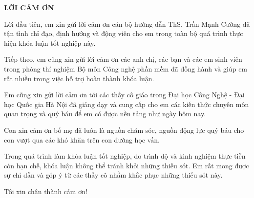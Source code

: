 \begin{center}
\textbf{\large{LỜI CẢM ƠN}	}
\end{center}
Lời đầu tiên, em xin gửi lời cảm ơn cán bộ hướng dẫn ThS. Trần Mạnh Cường đã tận tình chỉ đạo, định hướng và động viên cho em trong toàn bộ quá trình thực hiện khóa luận tốt nghiệp này.

Tiếp theo, em cũng xin gửi lời cảm ơn các anh chị, các bạn và các em sinh viên trong phòng thí nghiệm Bộ môn Công nghệ phần mềm đã đồng hành và giúp em rất nhiều trong việc hỗ trợ hoàn thành khóa luận.

Em cũng xin gửi lời cảm ơn tới các thầy cô giáo trong Đại học Công Nghệ - Đại học Quốc gia Hà Nội đã giảng dạy và cung cấp cho em các kiến thức chuyên môn quan trọng và quý báu để em có được nền tảng như ngày hôm nay.

Con xin cảm ơn bố mẹ đã luôn là nguồn chăm sóc, nguồn động lực quý báu cho con vượt qua các khó khăn trên con đường học vấn.


Trong quá trình làm khóa luận tốt nghiệp, do trình độ và kinh nghiệm thực tiễn còn hạn chế, khóa luận không thể tránh khỏi những thiếu sót. Em rất mong được sự chỉ dẫn và góp ý từ các thầy cô nhằm khắc phục những thiếu sót này.

Tôi xin chân thành cảm ơn!
